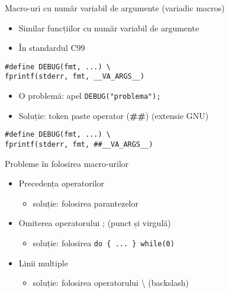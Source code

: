 \documentclass{beamer}
\begin{document}
\begin{frame}{Macro-uri cu număr variabil de argumente (variadic macros)}
	\begin{itemize}
		\item Similar funcțiilor cu număr variabil de argumente
		\item În standardul C99
	\end{itemize}

	\begin{beamerboxesrounded}[lower=block body,shadow=true]{}
\texttt{\#define DEBUG(fmt, ...) \textbackslash{} \\
\hlstd{}\hlstd{\ \ \ \ \ \ \ \ }\hlstd{}fprintf(stderr, fmt, \_\_VA\_ARGS\_\_)}
	\end{beamerboxesrounded}

	\begin{itemize}
		\pause \item O problemă: apel \texttt{DEBUG("problema");}
		\pause \item Soluție: token paste operator (\textbf{\#\#}) (extensie GNU)
	\end{itemize}

	\pause \begin{beamerboxesrounded}[lower=block body,shadow=true]{}
\texttt{\#define DEBUG(fmt, ...) \textbackslash{} \\
\hlstd{}\hlstd{\ \ \ \ \ \ \ \ }\hlstd{}fprintf(stderr, fmt, \#\#\_\_VA\_ARGS\_\_)}
	\end{beamerboxesrounded}
\end{frame}

\begin{frame}{Probleme în folosirea macro-urilor}
	\begin{itemize}
		\pause \item Precedența operatorilor
			\begin{itemize}
				\item soluție: folosirea parantezelor
			\end{itemize}
		\pause \item Omiterea operatorului ; (punct și virgulă)
			\begin{itemize}
				\item soluție: folosirea \texttt{do \{ ... \} while(0)}
			\end{itemize}
		\pause \item Linii multiple
			\begin{itemize}
				\item soluție: folosirea operatorului \textbackslash{}
(backslash)
			\end{itemize}
	\end{itemize}
\end{frame}
\end{document}
